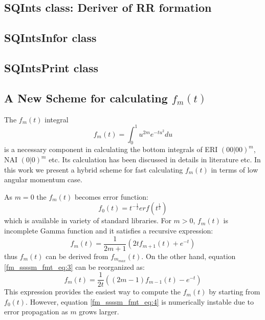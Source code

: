 \subsection{SQInts class: Deriver of RR formation}

\subsection{SQIntsInfor class}

\subsection{SQIntsPrint class}

\subsection{A New Scheme for calculating $f_{m}(t)$}
\label{fmt}

The $f_{m}(t)$ integral
\begin{equation}\label{fm_ssssm_fmt_eq:1}
 f_{m}(t) = \int^{1}_{0} u^{2m} e^{-tu^{2}} du 
\end{equation}
is a necessary component in calculating the bottom integrals of ERI $(00|00)^{m}$,
NAI $(0|0)^{m}$ etc. Its calculation has been discussed in details in literature
\cite{harris1983sssm, gill1991two} etc. In this work we present a hybrid scheme 
for fast calculating $f_{m}(t)$ in terms of low angular momentum case.

As $m=0$ the $f_{m}(t)$ becomes error function:
\begin{equation}
 f_{0}(t) = t^{-\frac{1}{2}} erf(t^{\frac{1}{2}})
\label{fm_ssssm_fmt_eq:2}
\end{equation}
which is available in variety of standard libraries. For $m>0$, $f_{m}(t)$
is incomplete Gamma function and it satisfies a recursive expression:
\begin{equation}
  f_{m}(t) = \frac{1}{2m+1}\left( 2tf_{m+1}(t) + e^{-t}\right)  
 \label{fm_ssssm_fmt_eq:3}
\end{equation}
thus $f_{m}(t)$ can be derived from $f_{m_{max}}(t)$. On the other hand, equation
\ref{fm_ssssm_fmt_eq:3} can be reorganized as:
\begin{equation}
  f_{m}(t) = \frac{1}{2t}\left( (2m-1)f_{m-1}(t) - e^{-t}\right)    
 \label{fm_ssssm_fmt_eq:4}
\end{equation}
This expression provides the easiest way to compute the $f_{m}(t)$ by starting from 
$f_{0}(t)$. However, equation \ref{fm_ssssm_fmt_eq:4} is numerically instable due to
error propagation as $m$ grows larger.

